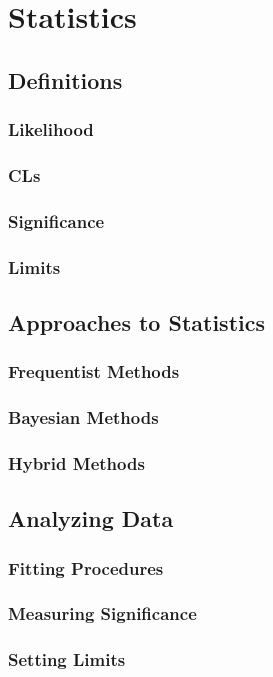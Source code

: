 \chapter{Statistics}

\section{Definitions}
\subsection{Likelihood}
\subsection{CLs}
\subsection{Significance}
\subsection{Limits}

\section{Approaches to Statistics}
\subsection{Frequentist Methods}
\subsection{Bayesian Methods}
\subsection{Hybrid Methods}

\section{Analyzing Data}
\subsection{Fitting Procedures}
\subsection{Measuring Significance}
\subsection{Setting Limits}
